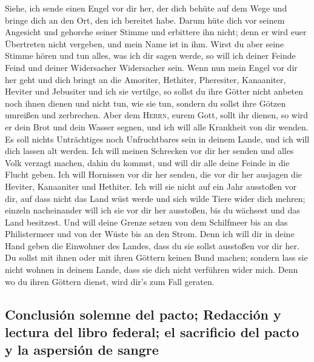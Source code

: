  Siehe, ich sende einen Engel vor dir her, der dich
behüte auf dem Wege und bringe dich an den Ort, den ich bereitet habe.
 Darum hüte dich vor seinem Angesicht und gehorche seiner
Stimme und erbittere ihn nicht; denn er wird euer Übertreten nicht
vergeben, und mein Name ist in ihm.  Wirst du aber seine
Stimme hören und tun alles, was ich dir sagen werde, so will ich deiner
Feinde Feind und deiner Widersacher Widersacher sein. 
Wenn nun mein Engel vor dir her geht und dich bringt an die Amoriter,
Hethiter, Pheresiter, Kanaaniter, Heviter und Jebusiter und ich sie
vertilge,  so sollst du ihre Götter nicht anbeten noch
ihnen dienen und nicht tun, wie sie tun, sondern du sollst ihre Götzen
umreißen und zerbrechen.  Aber dem \textsc{Herrn}, eurem
Gott, sollt ihr dienen, so wird er dein Brot und dein Wasser segnen, und
ich will alle Krankheit von dir wenden.  Es soll nichts
Unträchtiges noch Unfruchtbares sein in deinem Lande, und ich will dich
lassen alt werden.  Ich will meinen Schrecken vor dir her
senden und alles Volk verzagt machen, dahin du kommst, und will dir alle
deine Feinde in die Flucht geben.  Ich will Hornissen vor
dir her senden, die vor dir her ausjagen die Heviter, Kanaaniter und
Hethiter.  Ich will sie nicht auf ein Jahr ausstoßen vor
dir, auf dass nicht das Land wüst werde und sich wilde Tiere wider dich
mehren;  einzeln nacheinander will ich sie vor dir her
ausstoßen, bis du wächsest und das Land besitzest.  Und
will deine Grenze setzen von dem Schilfmeer bis an das Philistermeer und
von der Wüste bis an den Strom. Denn ich will dir in deine Hand geben
die Einwohner des Landes, dass du sie sollst ausstoßen vor dir her.
 Du sollst mit ihnen oder mit ihren Göttern keinen Bund
machen;  sondern lass sie nicht wohnen in deinem Lande,
dass sie dich nicht verführen wider mich. Denn wo du ihren Göttern
dienst, wird dir's zum Fall geraten.

\hypertarget{conclusiuxf3n-solemne-del-pacto-redacciuxf3n-y-lectura-del-libro-federal-el-sacrificio-del-pacto-y-la-aspersiuxf3n-de-sangre}{%
\subsection{Conclusión solemne del pacto; Redacción y lectura del libro
federal; el sacrificio del pacto y la aspersión de
sangre}\label{conclusiuxf3n-solemne-del-pacto-redacciuxf3n-y-lectura-del-libro-federal-el-sacrificio-del-pacto-y-la-aspersiuxf3n-de-sangre}}

